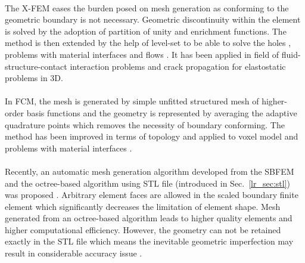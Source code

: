 \paragraph{}
The X-FEM eases the burden posed on mesh generation as conforming to the geometric boundary is not necessary.
Geometric discontinuity within the element is solved by the adoption of partition of unity \citep{MELENK1996289} and enrichment functions.
The method is then extended by the help of level-set \citep{OSHER198812} to be able to solve the holes \citep{Sukumar2001}, problems with material interfaces \citep{doi:10.1002/nme.2259} and flows \citep{Chessa2003}.
It has been applied in field of fluid-structure-contact interaction problems \citep{Mayer2010} and crack propagation for elastostatic problems \citep{doi:10.1002/nme.429,doi:10.1002/nme.430} in 3D.

\paragraph{}
In FCM, the mesh is generated by simple unfitted structured mesh of higher-order basis functions and the geometry is represented by averaging the adaptive quadrature points which removes the necessity of boundary conforming.
The method has been improved in terms of topology \citep{Parvizian2012} and applied to voxel model \citep{doi:10.1002/nme.3289} and problems with material interfaces \citep{Joulaian2013}.

\paragraph{}
Recently, an automatic mesh generation algorithm developed from the SBFEM and the octree-based algorithm using STL file (introduced in Sec.~\ref{lr_sec:stl}) was proposed \citep{Liu2017}.
Arbitrary element faces are allowed in the scaled boundary finite element which significantly decreases the limitation of element shape.
Mesh generated from an octree-based algorithm leads to higher quality elements and higher computational efficiency.
However, the geometry can not be retained exactly in the STL file which means the inevitable geometric imperfection may result in considerable accuracy issue \citep{Hug2005}.

